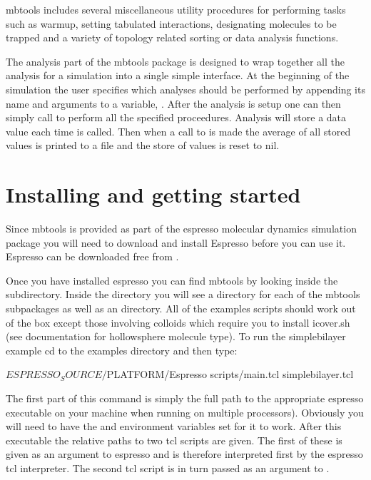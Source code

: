 mbtools includes several miscellaneous utility procedures for
performing tasks such as warmup, setting tabulated interactions,
designating molecules to be trapped and a variety of topology related
sorting or data analysis functions.

The analysis part of the mbtools package is designed to wrap together
all the analysis for a simulation into a single simple interface. At
the beginning of the simulation the user specifies which analyses
should be performed by appending its name and arguments to a variable,
. After the analysis is setup one can then
simply call  to perform all the specified
proceedures. Analysis will store a data value each time
 is called. Then when a call to
 is made the average of all stored values is
printed to a file and the store of values is reset to nil.

\section{Installing and getting started}

Since mbtools is provided as part of the espresso molecular dynamics
simulation package you will need to download and install Espresso
before you can use it. Espresso can be downloaded free from
.

Once you have installed espresso you can find mbtools by looking
inside the  subdirectory. Inside the
 directory you will see a directory for each
of the mbtools subpackages as well as an 
directory. All of the examples scripts should work out of the box
except those involving colloids which require you to install icover.sh
(see documentation for hollowsphere molecule type). To run the
simplebilayer example cd to the examples directory and then type:

\begin{code}
  $ESPRESSO_SOURCE/$PLATFORM/Espresso scripts/main.tcl simplebilayer.tcl
\end{code}

The first part of this command is simply the full path to the
appropriate espresso executable on your machine 
when running on multiple processors). Obviously
you will need to have the  and
 environment variables set for it to work. After
this executable the relative paths to two tcl scripts are given. The
first of these  is given as an argument to espresso
and is therefore interpreted first by the espresso tcl
interpreter. The second tcl script  is in
turn passed as an argument to .

